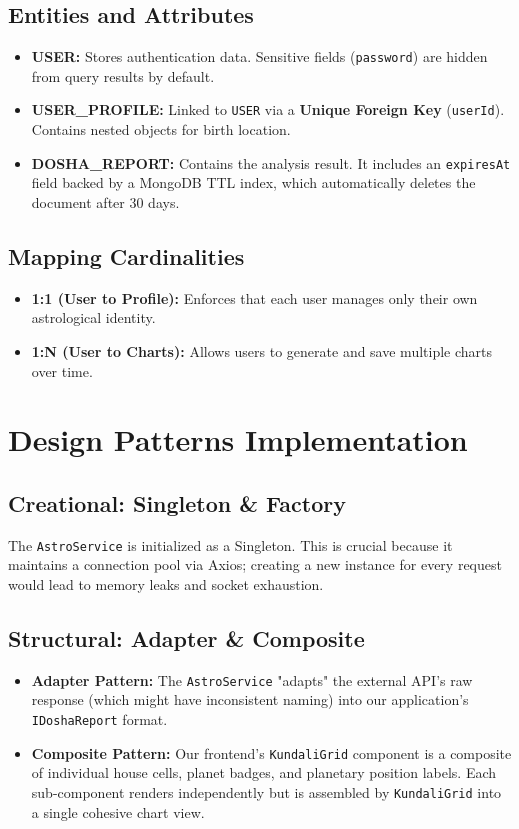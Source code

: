 \documentclass[12pt,a4paper]{article}
\begin{document}
\subsection{Entities and Attributes}
\begin{itemize}
    \item \textbf{USER:} Stores authentication data. Sensitive fields (\texttt{password}) are hidden from query results by default.
    \item \textbf{USER\_PROFILE:} Linked to \texttt{USER} via a \textbf{Unique Foreign Key} (\texttt{userId}). Contains nested objects for birth location.
    \item \textbf{DOSHA\_REPORT:} Contains the analysis result. It includes an \texttt{expiresAt} field backed by a MongoDB TTL index, which automatically deletes the document after 30 days.
\end{itemize}

\subsection{Mapping Cardinalities}
\begin{itemize}
    \item \textbf{1:1 (User to Profile):} Enforces that each user manages only their own astrological identity.
    \item \textbf{1:N (User to Charts):} Allows users to generate and save multiple charts over time.
\end{itemize}

\section{Design Patterns Implementation}

\subsection{Creational: Singleton \& Factory}
The \texttt{AstroService} is initialized as a Singleton. This is crucial because it maintains a connection pool via Axios; creating a new instance for every request would lead to memory leaks and socket exhaustion.

\subsection{Structural: Adapter \& Composite}
\begin{itemize}
    \item \textbf{Adapter Pattern:} The \texttt{AstroService} "adapts" the external API's raw response (which might have inconsistent naming) into our application's \texttt{IDoshaReport} format.
    \item \textbf{Composite Pattern:} Our frontend's \texttt{KundaliGrid} component is a composite of individual house cells, planet badges, and planetary position labels. Each sub-component renders independently but is assembled by \texttt{KundaliGrid} into a single cohesive chart view.
\end{itemize}
\end{document}
